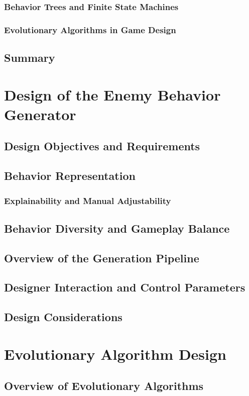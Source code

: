 \documentclass[12pt, twoside, openany]{book}
\begin{document}
	\subsection{Behavior Trees and Finite State Machines}
	\subsection{Evolutionary Algorithms in Game Design}
	\section{Summary}
	
	\chapter{Design of the Enemy Behavior Generator}
	\section{Design Objectives and Requirements}
	\section{Behavior Representation}
	\subsection{Explainability and Manual Adjustability}
	\section{Behavior Diversity and Gameplay Balance}
	\section{Overview of the Generation Pipeline}
	\section{Designer Interaction and Control Parameters}
	\section{Design Considerations}
	
	\chapter{Evolutionary Algorithm Design}
	\section{Overview of Evolutionary Algorithms}
\end{document}
